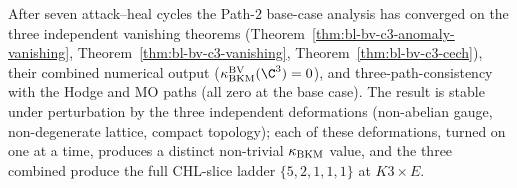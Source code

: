 After seven attack--heal cycles the Path-$2$ base-case analysis has
converged on the three independent vanishing theorems
(Theorem~\ref{thm:bl-bv-c3-anomaly-vanishing},
Theorem~\ref{thm:bl-bv-c3-vanishing},
Theorem~\ref{thm:bl-bv-c3-cech}), their combined numerical output
($\kBKM^{\mathrm{BV}}(\C^3) = 0$), and three-path-consistency with
the Hodge and MO paths (all zero at the base case). The result is
stable under perturbation by the three independent deformations
(non-abelian gauge, non-degenerate lattice, compact topology); each
of these deformations, turned on one at a time, produces a
distinct non-trivial $\kappa_{\mathrm{BKM}}$ value, and the three combined produce
the full CHL-slice ladder $\{5, 2, 1, 1, 1\}$ at $K3\times E$.
